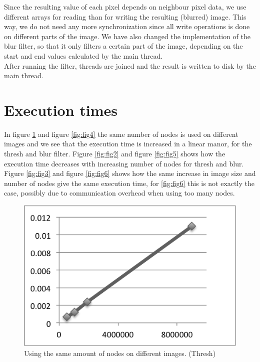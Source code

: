 \documentclass[a4paper]{article}
\begin{document}
Since the resulting value of each pixel depends on neighbour pixel data,
we use different arrays for reading than for writing the resulting
(blurred) image. This way, we do not need any more synchronization since
all write operations is done on different parts of the image. We have
also changed the implementation of the blur filter, so that it only
filters a certain part of the image, depending on the start and end
values calculated by the main thread.\\

After running the filter, threads are joined and the result is written
to disk by the main thread.

\section{Execution times}

In figure \ref{fig:fig1} and figure \ref{fig:fig4} the same number of
nodes is used on different images and we see that the execution time is
increased in a linear manor, for the thresh and blur filter. Figure
\ref{fig:fig2} and figure \ref{fig:fig5} shows how the execution time
decreases with increasing number of nodes for thresh and blur. Figure
\ref{fig:fig3} and figure \ref{fig:fig6} shows how the same increase in
image size and number of nodes give the same execution time, for
\ref{fig:fig6} this is not exactly the case, possibly due to
communication overhead when using too many nodes.

\begin{figure}[h]
  \centering
  \includegraphics{processor.png}
  \caption{Using the same amount of nodes on different images. (Thresh)}
  \label{fig:fig1}
\end{figure}
\end{document}
